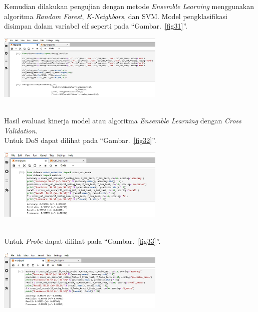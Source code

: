 \documentclass[conference]{IEEEtran}
\begin{document}
Kemudian dilakukan pengujian dengan metode \emph{Ensemble Learning} menggunakan algoritma \emph{Random Forest}, \emph{K-Neighbors}, dan SVM. Model pengklasifikasi disimpan dalam variabel clf seperti pada ``Gambar.~\ref{fig31}''.\\

\begin{minipage}{\linewidth}
\centerline{\includegraphics[width=80mm]{Gambar/Gbr30.jpg}}
\label{fig31}
\end{minipage}\\

Hasil evaluasi kinerja model atau algoritma \emph{Ensemble Learning} dengan \emph{Cross Validation}.\\
Untuk DoS dapat dilihat pada ``Gambar.~\ref{fig32}''.\\

\begin{minipage}{\linewidth}
\centerline{\includegraphics[width=80mm]{Gambar/Gbr31.jpg}}
\label{fig32}
\end{minipage}\\

\noindent Untuk \emph{Probe} dapat dilihat pada ``Gambar.~\ref{fig33}''.\\

\begin{minipage}{\linewidth}
\centerline{\includegraphics[width=80mm]{Gambar/Gbr32.jpg}}
\label{fig33}
\end{minipage}\\
\end{document}
